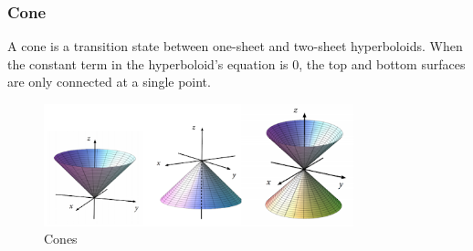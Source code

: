 \subsubsection{Cone}
A cone is a transition state between one-sheet and two-sheet hyperboloids.
When the constant term in the hyperboloid's equation is 0, the top and bottom surfaces are only connected at a single point.

\begin{figure}[H]
	\centering
	\includegraphics[width=0.8\textwidth]{./Images/differentialMultivariableCalculus/cones.png}
	\caption{Cones}
\end{figure}